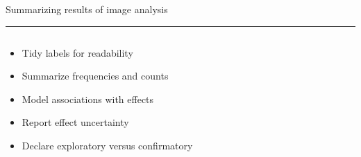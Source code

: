 \documentclass[aspectratio=169]{beamer}
\newcommand{\TitleFont}{\rmfamily}
\begin{document}
\begin{frame}[t]{}
  \vspace*{0.5cm}
  {\TitleFont\fontsize{18}{22}\selectfont\color{LUBronze}Summarizing results of image analysis\par}
  \vspace{0.3em}
  {\color{LUBronze}\rule{\linewidth}{0.8pt}}\par
  \vspace{0.2cm}
  \begin{columns}[t]
    \begin{column}[t]{0.45\textwidth}
      \vspace*{0pt}
      \begin{itemize}\setlength\itemsep{0.65em}
        \item Tidy labels for readability
        \item Summarize frequencies and counts
        \item Model associations with effects
        \item Report effect uncertainty
        \item Declare exploratory versus confirmatory
      \end{itemize}
    \end{column}
  \end{columns}
\end{frame}
\end{document}
